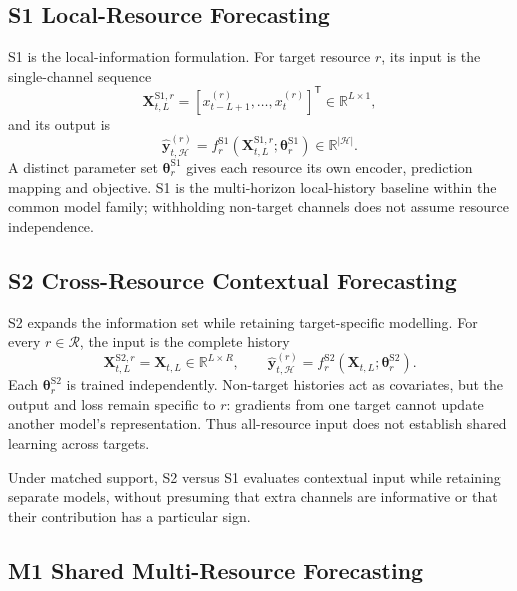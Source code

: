 \documentclass[a4paper,11pt]{article}
\begin{document}
\subsection*{S1 Local-Resource Forecasting}


S1 is the local-information formulation. For target resource $r$, its input is
the single-channel sequence
\begin{equation}
  \mathbf{X}_{t,L}^{\mathrm{S1},r}
  = [x_{t-L+1}^{(r)},\ldots,x_t^{(r)}]^{\mathsf T}
  \in\mathbb{R}^{L\times 1},
  \label{eq:s1-input}
\end{equation}
and its output is
\begin{equation}
  \widehat{\mathbf{y}}_{t,\mathcal{H}}^{(r)}
  = f_r^{\mathrm{S1}}
    (\mathbf{X}_{t,L}^{\mathrm{S1},r};\boldsymbol{\theta}_r^{\mathrm{S1}})
  \in\mathbb{R}^{|\mathcal{H}|}.
  \label{eq:s1-forecast}
\end{equation}
A distinct parameter set $\boldsymbol{\theta}_r^{\mathrm{S1}}$ gives each
resource its own encoder, prediction mapping and objective. S1 is the
multi-horizon local-history baseline within the common model family;
withholding non-target channels does not assume resource independence.

\subsection*{S2 Cross-Resource Contextual Forecasting}


S2 expands the information set while retaining target-specific modelling. For
every $r\in\mathcal{R}$, the input is the complete history
\begin{equation}
  \mathbf{X}_{t,L}^{\mathrm{S2},r}=\mathbf{X}_{t,L}
  \in\mathbb{R}^{L\times R},
  \qquad
  \widehat{\mathbf{y}}_{t,\mathcal{H}}^{(r)}
  = f_r^{\mathrm{S2}}
    (\mathbf{X}_{t,L};\boldsymbol{\theta}_r^{\mathrm{S2}}).
  \label{eq:s2-forecast}
\end{equation}
Each $\boldsymbol{\theta}_r^{\mathrm{S2}}$ is trained independently.
Non-target histories act as covariates, but the output and loss remain
specific to $r$: gradients from one target cannot update another model's
representation. Thus all-resource input does not establish shared learning
across targets.

Under matched support, S2 versus S1 evaluates contextual input while retaining
separate models, without presuming that extra channels are informative or
that their contribution has a particular sign.

\subsection*{M1 Shared Multi-Resource Forecasting}
\end{document}
